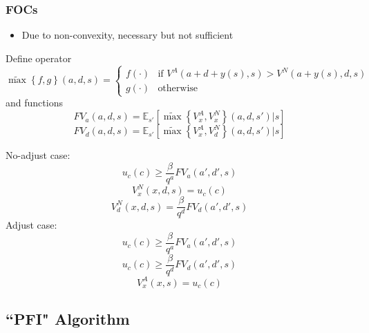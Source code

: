 \documentclass{beamer}
\begin{document}
\begin{frame}
  \frametitle{FOCs}
  \begin{itemize}
    \item Due to non-convexity, necessary but not sufficient
  \end{itemize}
  Define operator
  \begin{equation*}
    \tilde{\max}\left\{f,g\right\}(a,d,s) =
    \begin{cases}
    f(\cdot)& \text{if } V^A(a + d + y(s), s)>V^N(a + y(s), d, s)\\
    g(\cdot)              & \text{otherwise}
    \end{cases}
  \end{equation*}
  and functions
  \begin{equation*}
    FV_a(a,d,s) = \mathbb{E}_{s'} \left[\tilde{\max}\left\{V^A_x,V_x^N\right\}(a,d,s')|s\right]
  \end{equation*}
  \begin{equation*}
    FV_d(a,d,s) = \mathbb{E}_{s'} \left[\tilde{\max}\left\{V^A_x,V_d^N\right\}(a,d,s')|s\right]
  \end{equation*}
\end{frame}

\begin{frame}
  No-adjust case:
  \begin{equation} \tag{EE-N}
    u_c(c)\geq \frac{\beta}{q^a}FV_a(a',d',s)
  \end{equation}
  \begin{equation} \tag{Env-N 1}
    V^N_x(x,d,s) = u_c(c)
  \end{equation}
  \begin{equation} \tag{Env-N 2}
    V^N_d(x,d,s) = \frac{\beta}{q^d}FV_d(a',d',s)
  \end{equation}
  Adjust case:
  \begin{equation} \tag{EE-A}
    u_c(c)\geq \frac{\beta}{q^a}FV_a(a',d',s)
  \end{equation}
  \begin{equation} \tag{Portfolio}
    u_c(c)\geq \frac{\beta}{q^d}FV_d(a',d',s)
  \end{equation}
  \begin{equation} \tag{Env-A}
    V^A_x(x,s) = u_c(c)
  \end{equation}
\end{frame}

\subsection{``PFI" Algorithm}
\end{document}
